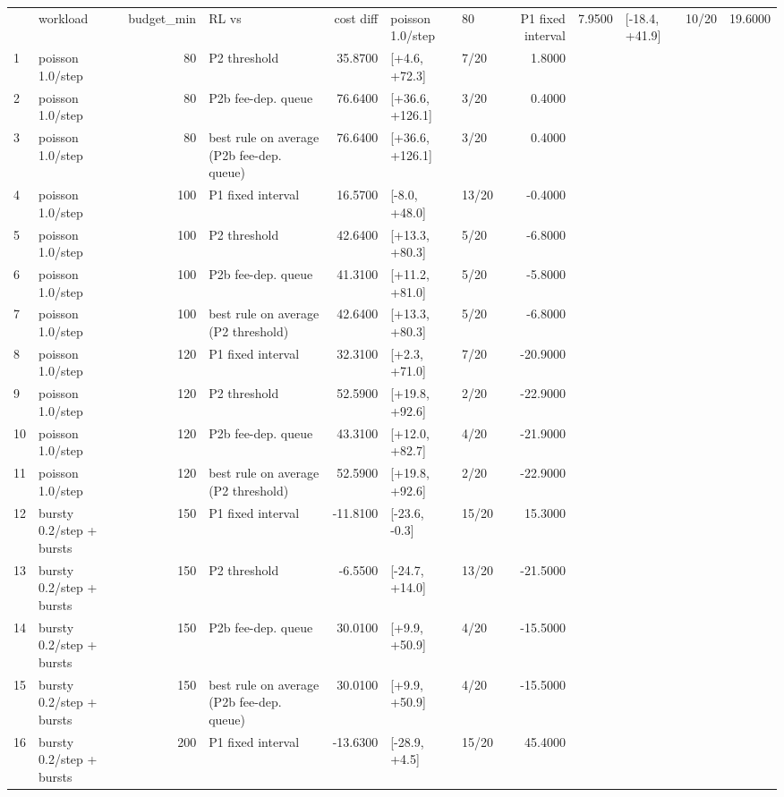 \begin{tabular}{llrlrllr}
\toprule
 & workload & budget_min & RL vs & cost diff %
 & poisson 1.0/step & 80 & P1 fixed interval & 7.9500 & [-18.4, +41.9] & 10/20 & 19.6000 \\
1 & poisson 1.0/step & 80 & P2 threshold & 35.8700 & [+4.6, +72.3] & 7/20 & 1.8000 \\
2 & poisson 1.0/step & 80 & P2b fee-dep. queue & 76.6400 & [+36.6, +126.1] & 3/20 & 0.4000 \\
3 & poisson 1.0/step & 80 & best rule on average (P2b fee-dep. queue) & 76.6400 & [+36.6, +126.1] & 3/20 & 0.4000 \\
4 & poisson 1.0/step & 100 & P1 fixed interval & 16.5700 & [-8.0, +48.0] & 13/20 & -0.4000 \\
5 & poisson 1.0/step & 100 & P2 threshold & 42.6400 & [+13.3, +80.3] & 5/20 & -6.8000 \\
6 & poisson 1.0/step & 100 & P2b fee-dep. queue & 41.3100 & [+11.2, +81.0] & 5/20 & -5.8000 \\
7 & poisson 1.0/step & 100 & best rule on average (P2 threshold) & 42.6400 & [+13.3, +80.3] & 5/20 & -6.8000 \\
8 & poisson 1.0/step & 120 & P1 fixed interval & 32.3100 & [+2.3, +71.0] & 7/20 & -20.9000 \\
9 & poisson 1.0/step & 120 & P2 threshold & 52.5900 & [+19.8, +92.6] & 2/20 & -22.9000 \\
10 & poisson 1.0/step & 120 & P2b fee-dep. queue & 43.3100 & [+12.0, +82.7] & 4/20 & -21.9000 \\
11 & poisson 1.0/step & 120 & best rule on average (P2 threshold) & 52.5900 & [+19.8, +92.6] & 2/20 & -22.9000 \\
12 & bursty 0.2/step + bursts & 150 & P1 fixed interval & -11.8100 & [-23.6, -0.3] & 15/20 & 15.3000 \\
13 & bursty 0.2/step + bursts & 150 & P2 threshold & -6.5500 & [-24.7, +14.0] & 13/20 & -21.5000 \\
14 & bursty 0.2/step + bursts & 150 & P2b fee-dep. queue & 30.0100 & [+9.9, +50.9] & 4/20 & -15.5000 \\
15 & bursty 0.2/step + bursts & 150 & best rule on average (P2b fee-dep. queue) & 30.0100 & [+9.9, +50.9] & 4/20 & -15.5000 \\
16 & bursty 0.2/step + bursts & 200 & P1 fixed interval & -13.6300 & [-28.9, +4.5] & 15/20 & 45.4000 \\

\end{tabular}
